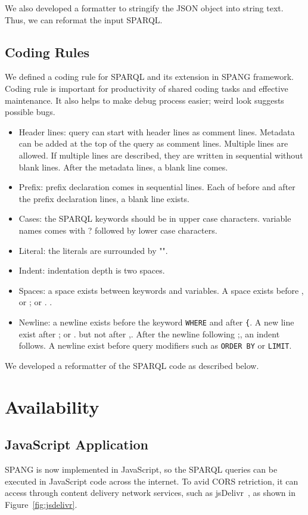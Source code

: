 \documentclass[runningheads]{llncs}
\begin{document}
We also developed a formatter to stringify the JSON object into string text. Thus, we can reformat the input SPARQL.


\subsection{Coding Rules}
We defined a coding rule for SPARQL and its extension in SPANG framework. Coding rule is important for productivity of shared coding tasks and effective maintenance. It also helps to make debug process easier; weird look suggests possible bugs. 
\begin{itemize}
    \item Header lines: query can start with header lines as comment lines. Metadata can be added at the top of the query as comment lines. Multiple lines are allowed. If multiple lines are described, they are written in sequential without blank lines. After the metadata lines, a blank line comes.
    \item Prefix: prefix declaration comes in sequential lines. Each of before and after the prefix declaration lines, a blank line exists.
    \item Cases: the SPARQL keywords should be in upper case characters. variable names comes with ? followed by lower case characters.
    \item Literal: the literals are surrounded by "".
    \item Indent: indentation depth is two spaces.
    \item Spaces: a space exists between keywords and variables. A space exists before , or ; or . .
    \item Newline: a newline exists before the keyword \texttt{WHERE} and after \texttt{\{}. A new line exist after ; or . but not after ,. After the newline following ;, an indent follows. A newline exist before query modifiers such as \texttt{ORDER BY} or \texttt{LIMIT}.
\end{itemize}
We developed a reformatter of the SPARQL code as described below.


\section{Availability}


\subsection{JavaScript Application}
SPANG is now implemented in JavaScript, so the SPARQL queries can be executed in JavaScript code across the internet. To avid CORS retriction, it can access through content delivery network services, such as jsDelivr~\cite{jsdelivr}, as shown in Figure~\ref{fig:jsdelivr}.
\end{document}
